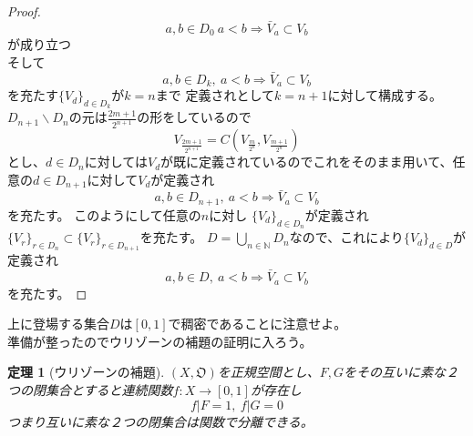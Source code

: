 \documentclass{jsarticle}
\newtheorem{theorem}{定理}
\begin{document}
\begin{proof}
\[
a,b\in D_0\ a<b\Rightarrow \bar{V}_a\subset V_b
\]が成り立つ\\ 
そして
\[
a,b\in D_k,\ a<b\Rightarrow \bar{V}_a\subset V_b
\]を充たす$\{V_d\}_{d\in D_{k}}$が$k=n$まで
定義されとして$k=n+1$に対して構成する。
$D_{n+1}\backslash D_n$の元は$\frac{2m+1}{2^{n+1}}$の形をしているので
\[
V_{\frac{2m+1}{2^{n+1}}}=C(V_{\frac{m}{2^n}},V_{\frac{m+1}{2^n}})
\]とし、$d\in D_n$に対しては$V_d$が既に定義されているのでこれをそのまま用いて、任意の$d\in D_{n+1}$に対して$V_d$が定義され
\[
a,b\in D_{n+1},\ a<b\Rightarrow \bar{V}_a\subset V_b
\]を充たす。
このようにして任意の$n$に対し
$\{V_d\}_{d\in D_{n}}$が定義され$\{V_r\}_{r\in D_{n}}\subset \{V_r\}_{r\in D_{n+1}}$を充たす。
$D=\bigcup_{n\in \mathbb{N}}D_{n}$なので、これにより$\{V_d\}_{d\in D}$が定義され
\[
a,b\in D,\ a<b\Rightarrow \bar{V}_a\subset V_b
\]を充たす。
\end{proof}
上に登場する集合$D$は$[0,1]$で稠密であることに注意せよ。\\ 
準備が整ったのでウリゾーンの補題の証明に入ろう。
\begin{theorem}[ウリゾーンの補題]
$(X,\mathfrak{O})$を正規空間とし、$F,G$をその互いに素な２つの閉集合とすると連続関数$f:X\rightarrow [0,1]$が存在し
\[
f|F=1,\ f|G=0
\]つまり互いに素な２つの閉集合は関数で分離できる。
\end{theorem}

\newpage
\end{document}
